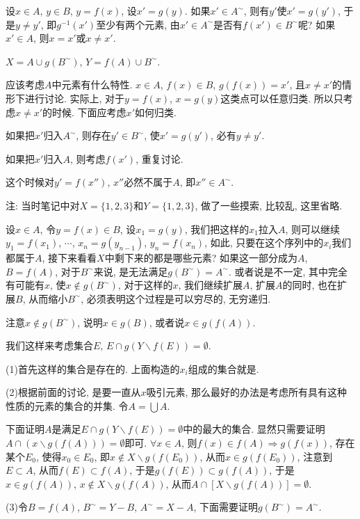 \documentclass[12pt,a4paper,openany]{book}
\begin{document}
设$x \in A$, $y \in B$, $y = f(x)$, 设$x' = g(y)$. 如果$x' \in A^{\sim}$, 则有$y'$使$x' = g(y')$, 于是$y \neq y'$, 即$g^{-1}(x')$至少有两个元素, 由$x' \in A^{\sim}$是否有$f(x') \in B^{\sim}$呢? 如果$x' \in A$, 则$x = x'$或$x \neq x'$.

$X = A \cup g(B^{\sim})$, $Y = f(A) \cup B^{\sim}$.

应该考虑$A$中元素有什么特性. $x \in A$, $f(x) \in B$, $g(f(x)) = x'$, 且$x \neq x'$的情形下进行讨论. 实际上, 对于$y = f(x)$, $x = g(y)$这类点可以任意归类. 所以只考虑$x \neq x'$的时候. 下面应考虑$x'$如何归类.

如果把$x'$归入$A^{\sim}$, 则存在$y' \in B^{\sim}$, 使$x' = g(y')$, 必有$y \neq y'$.

如果把$x'$归入$A$, 则考虑$f(x')$, 重复讨论.

这个时候对$y' = f(x'')$, $x''$必然不属于$A$, 即$x'' \in A^{\sim}$.

注: 当时笔记中对$X = \{1, 2, 3\}$和$Y = \{1, 2, 3\}$, 做了一些摸索, 比较乱, 这里省略.

设$x \in A$, 令$y = f(x) \in B$, 设$x_1 = g(y)$, 我们把这样的$x_1$拉入$A$, 则可以继续$y_1 = f(x_1)$, $\cdots$, $x_n = g(y_{n-1})$, $y_n = f(x_n)$, 如此, 只要在这个序列中的$x_i$我们都属于$A$, 接下来看看$X$中剩下来的都是哪些元素? 如果这一部分成为$A$, $B = f(A)$, 对于$B^{\sim}$来说, 是无法满足$g(B^{\sim}) = A^{\sim}$. 或者说是不一定, 其中完全有可能有$x$, 使$x \notin g(B^{\sim})$, 对于这样的$x$, 我们继续扩展$A$, 扩展$A$的同时, 也在扩展$B$, 从而缩小$B^{\sim}$, 必须表明这个过程是可以穷尽的, 无穷递归.

注意$x \notin g(B^{\sim})$, 说明$x \in g(B)$, 或者说$x \in g(f(A))$.

我们这样来考虑集合$E$, $E \cap g(Y \backslash f(E)) = \emptyset$.

(1)首先这样的集合是存在的. 上面构造的$x_i$组成的集合就是.

(2)根据前面的讨论, 是要一直从$x$吸引元素, 那么最好的办法是考虑所有具有这种性质的元素的集合的并集. 令$A = \bigcup{A}$.

下面证明$A$是满足$E \cap g(Y \backslash f(E)) = \emptyset$中的最大的集合. 显然只需要证明$A \cap (x \backslash g(f(A))) = \emptyset$即可. $\forall x \in A$, 则$f(x) \in f(A)\Rightarrow g(f(x))$, 存在某个$E_0$, 使得$x_0 \in E_0$, 即$x \notin X \backslash g(f(E_0))$, 从而$x \in g(f(E_0))$, 注意到$E \subset A$, 从而$f(E) \subset f(A)$, 于是$g(f(E)) \subset g(f(A))$, 于是$x \in g(f(A))$, $x \notin X \backslash g(f(A))$, 从而$A \cap [X \backslash g(f(A))] = \emptyset$.

(3)令$B = f(A)$, $B^{\sim} = Y - B$, $A^{\sim} = X - A$, 下面需要证明$g(B^{\sim}) = A^{\sim}$.
\end{document}
